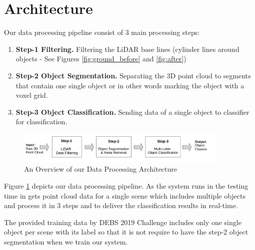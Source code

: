 \section{Architecture}\label{sec:Architecture}

Our data processing pipeline consist of 3 main processing steps: 

\begin{enumerate}
  \item \textbf{Step-1  Filtering. } Filtering the LiDAR base lines (cylinder lines around objects - See Figures \ref{fig:ground_before} and \ref{fig:after})
  \item \textbf{Step-2 Object Segmentation.} Separating the 3D point cloud to segments that contain one single object or in other words marking the object with a voxel grid.  
  \item \textbf{Step-3 Object Classification.}  Sending data of a single object to classifier for classification.  
\end{enumerate}

\begin{figure}[!hb]
 \begin{center}
   \includegraphics[width=0.9\textwidth]{./images/DataProcessingPipleline.pdf}
   \caption{An Overview of our Data Processing Architecture}
   \label{fig:dataPipeline}
 \end{center}
\end{figure}


Figure \ref{fig:dataPipeline} depicts our data processing pipeline. As the system runs in the testing time in gets point cloud data for a single scene which includes multiple objects and process it in 3 steps and to deliver the classification results in real-time.   

The provided training data by DEBS 2019 Challenge \cite{DEBSGC2019} includes only one single object per scene with its label so that it is not require to have the step-2 object segmentation when we train our system.






% 
% 
% 



